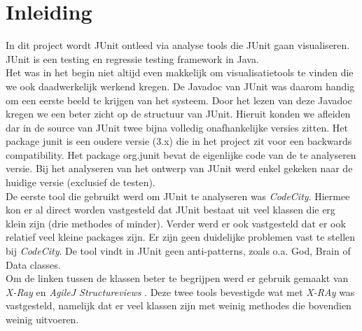 \documentclass[i1]{oss}
\begin{document}

\maketitlepage
\newpage
\tableofcontents
\pagebreak

\section*{Inleiding}


In dit project wordt JUnit ontleed via analyse tools die JUnit gaan visualiseren. JUnit is een testing en regressie testing framework in Java.\\


Het was in het begin niet altijd even makkelijk om visualisatietools te vinden die we ook daadwerkelijk werkend kregen. De Javadoc van JUnit was daarom handig om een eerste beeld te krijgen van het systeem. Door het lezen van deze Javadoc kregen we een beter zicht op de structuur van JUnit. Hieruit konden we afleiden dar in de source van JUnit twee bijna volledig onafhankelijke versies zitten. Het package junit is een oudere versie (3.x) die in het project zit voor een backwards compatibility. Het package org.junit bevat de eigenlijke code van de te analyseren versie. Bij het analyseren van het ontwerp van JUnit werd enkel gekeken naar de huidige versie (exclusief de testen).\\

De eerste tool die gebruikt werd om JUnit te analyseren was \emph{CodeCity}. Hiermee kon er al direct worden vastgesteld dat JUnit bestaat uit veel klassen die erg klein zijn (drie methodes of minder). Verder werd er ook vastgesteld dat er ook relatief veel kleine packages zijn. Er zijn geen duidelijke problemen vast te stellen bij \emph{CodeCity}. De tool vindt in JUnit geen anti-patterns, zoals o.a. God, Brain of Data classes. \\

Om de linken tussen de klassen beter te begrijpen werd er gebruik gemaakt van \emph{X-Ray} \cite{X-Ray} en \emph{AgileJ Structureviews} \cite{AgileJ Structureviews}. Deze twee tools bevestigde wat met \emph{X-RAy} was vastgesteld, namelijk dat er veel klassen zijn met weinig methodes die bovendien weinig uitvoeren.\\
\end{document}
